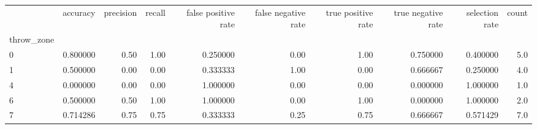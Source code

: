 \begin{tabular}{lrrrrrrrrr}
\toprule
{} &  accuracy &  precision &  recall &  false positive rate &  false negative rate &  true positive rate &  true negative rate &  selection rate &  count \\
throw\_zone &           &            &         &                      &                      &                     &                     &                 &        \\
\midrule
0          &  0.800000 &       0.50 &    1.00 &             0.250000 &                 0.00 &                1.00 &            0.750000 &        0.400000 &    5.0 \\
1          &  0.500000 &       0.00 &    0.00 &             0.333333 &                 1.00 &                0.00 &            0.666667 &        0.250000 &    4.0 \\
4          &  0.000000 &       0.00 &    0.00 &             1.000000 &                 0.00 &                0.00 &            0.000000 &        1.000000 &    1.0 \\
6          &  0.500000 &       0.50 &    1.00 &             1.000000 &                 0.00 &                1.00 &            0.000000 &        1.000000 &    2.0 \\
7          &  0.714286 &       0.75 &    0.75 &             0.333333 &                 0.25 &                0.75 &            0.666667 &        0.571429 &    7.0 \\
\bottomrule
\end{tabular}
